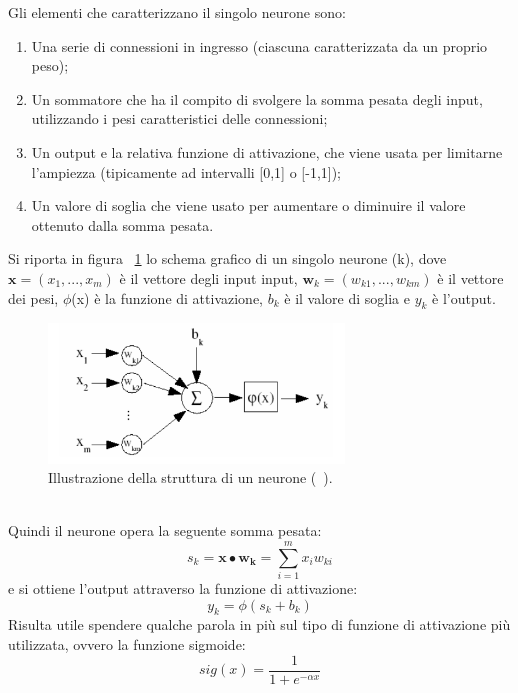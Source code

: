 Gli elementi che caratterizzano il singolo neurone sono:
\begin{enumerate}
	\item Una serie di connessioni in ingresso (ciascuna caratterizzata da un proprio peso);
	\item Un sommatore che ha il compito di svolgere la somma pesata degli input, utilizzando i pesi caratteristici delle connessioni;
	\item Un output e la relativa funzione di attivazione, che viene usata per limitarne l'ampiezza (tipicamente ad intervalli [0,1] o [-1,1]);
	\item Un valore di soglia che viene usato per aumentare o diminuire il valore ottenuto dalla somma pesata.
\end{enumerate}
Si riporta in figura ~\ref{schema_neurone} lo schema grafico di un singolo neurone (k), dove $\textbf{x} = (x_1 ,..., x_m)$ è il vettore degli input input, $\textbf{w}_k = (w_{k1} ,..., w_{km})$ è il vettore dei pesi, $\phi$(x) è la funzione di attivazione, $b_k$ è il valore di soglia e $y_k$ è l'output.
\begin{figure}[h!]
	\centering
	\includegraphics[width=0.70\textwidth]{figs/schema_neurone.png}
	\caption{Illustrazione della struttura di un neurone (~\cite{Intro_retiN}).}
	\label{schema_neurone}	
\end{figure} \\
Quindi il neurone opera la seguente somma pesata:
\begin{equation}
s_k = \textbf{x}\bullet\textbf{w}_\textbf{k} = \sum_{i=1}^{m}x_iw_{ki}
\label{sk}
\end{equation}
e si ottiene l'output attraverso la funzione di attivazione: 
\begin{equation}
y_k = \phi(s_k + b_k)
\end{equation}
Risulta utile spendere qualche parola in più sul tipo di funzione di attivazione più utilizzata, ovvero la funzione sigmoide:
\begin{equation}
sig(x) = \frac{1}{1 + e^{-{\alpha}x}}
\end{equation} 

